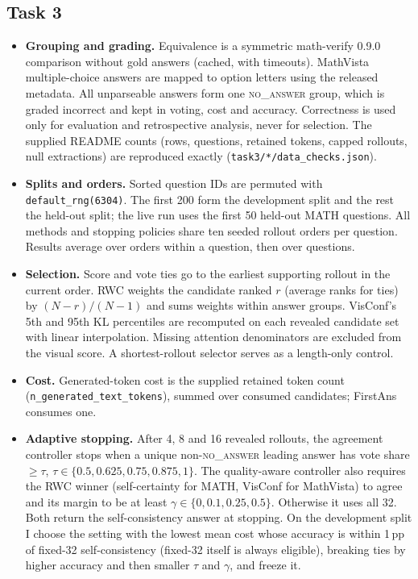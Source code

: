 \documentclass{article}
\begin{document}
\subsection{Task 3}
\begin{itemize}
\item \textbf{Grouping and grading.} Equivalence is a symmetric math-verify 0.9.0 comparison without gold answers (cached, with timeouts). MathVista multiple-choice answers are mapped to option letters using the released metadata. All unparseable answers form one \textsc{no\_answer} group, which is graded incorrect and kept in voting, cost and accuracy. Correctness is used only for evaluation and retrospective analysis, never for selection. The supplied README counts (rows, questions, retained tokens, capped rollouts, null extractions) are reproduced exactly (\texttt{task3/*/data\_checks.json}).
\item \textbf{Splits and orders.} Sorted question IDs are permuted with \texttt{default\_rng(6304)}. The first 200 form the development split and the rest the held-out split; the live run uses the first 50 held-out MATH questions. All methods and stopping policies share ten seeded rollout orders per question. Results average over orders within a question, then over questions.
\item \textbf{Selection.} Score and vote ties go to the earliest supporting rollout in the current order. RWC weights the candidate ranked $r$ (average ranks for ties) by $(N-r)/(N-1)$ and sums weights within answer groups. VisConf's 5th and 95th KL percentiles are recomputed on each revealed candidate set with linear interpolation. Missing attention denominators are excluded from the visual score. A shortest-rollout selector serves as a length-only control.
\item \textbf{Cost.} Generated-token cost is the supplied retained token count (\texttt{n\_generated\_text\_tokens}), summed over consumed candidates; FirstAns consumes one.
\item \textbf{Adaptive stopping.} After 4, 8 and 16 revealed rollouts, the agreement controller stops when a unique non-\textsc{no\_answer} leading answer has vote share $\ge\tau$, $\tau\in\{0.5,0.625,0.75,0.875,1\}$. The quality-aware controller also requires the RWC winner (self-certainty for MATH, VisConf for MathVista) to agree and its margin to be at least $\gamma\in\{0,0.1,0.25,0.5\}$. Otherwise it uses all 32. Both return the self-consistency answer at stopping. On the development split I choose the setting with the lowest mean cost whose accuracy is within 1\,pp of fixed-32 self-consistency (fixed-32 itself is always eligible), breaking ties by higher accuracy and then smaller $\tau$ and $\gamma$, and freeze it.

\end{itemize}
\end{document}

